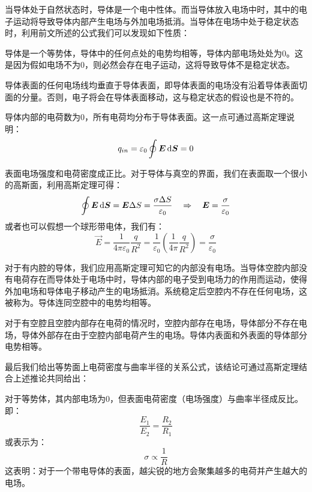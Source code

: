 当导体处于自然状态时，导体是一个电中性体。而当导体放入电场中时，其中的电子运动将导致导体内部产生电场与外加电场抵消。当导体在电场中处于稳定状态时，利用前文所述的公式我们可以发现如下性质：
\begin{Itemize}
    \item 导体是一个等势体，导体中的任何点处的电势均相等，导体内部电场处处为0。这是因为假如电场不为0，则必然会存在电子运动，这将导致导体不是稳定状态。
    \item 导体表面的任何电场线均垂直于导体表面，即导体表面的电场没有沿着导体表面切面的分量。否则，电子将会在导体表面移动，这与稳定状态的假设也是不符的。
    \item 导体内部的电荷数为0，所有电荷均分布于导体表面。这一点可通过高斯定理说明：
        \[q_{in}=\varepsilon_0\oint\vec{E}\dif{\vec{S}}=0\]
    \item 表面电场强度和电荷密度成正比。对于导体与真空的界面，我们在表面取一个很小的高斯面，利用高斯定理可得：
        \[\oint \vec{E}\dif{\vec{S}}=\vec{E}\Delta S=\dfrac{\sigma \Delta S}{\varepsilon_0}\quad\Rightarrow\quad \vec{E}=\dfrac{\sigma}{\varepsilon_0}\]
        或者也可以假想一个球形带电体，我们有：
        \[\vec{E}=\dfrac{1}{4\pi\varepsilon_0}\dfrac{q}{R^2}=\dfrac{1}{\varepsilon_0}(\dfrac{1}{4\pi}\dfrac{q}{R^2})=\dfrac{\sigma}{\varepsilon_0}\]
    \item 对于有内腔的导体，我们应用高斯定理可知它的内部没有电场。当导体空腔内部没有电荷存在而导体处于电场中时，导体内部的电子受到电场力的作用而运动，使得外加电场和导体电子移动产生的电场抵消。系统稳定后空腔内不存在任何电场，这被称为。导体连同空腔中的电势均相等。
    \item 对于有空腔且空腔内部存在电荷的情况时，空腔内部存在电场，导体部分不存在电场，导体外部存在由于空腔内部电荷产生的电场。导体内表面和外表面的导体部分电势相等。 
\end{Itemize}

最后我们给出等势面上电荷密度与曲率半径的关系公式，该结论可通过高斯定理结合上述推论共同给出：
\begin{law}
    对于等势体，其内部电场为0，但表面电荷密度（电场强度）与曲率半径成反比。即：
    \[\dfrac{E_1}{E_2}=\dfrac{R_2}{R_1}\]
    或表示为：
    \[\sigma\propto\dfrac{1}{R}\]
    这表明：对于一个带电导体的表面，越尖锐的地方会聚集越多的电荷并产生越大的电场。
\end{law}
\section[电容与电容器]{}
